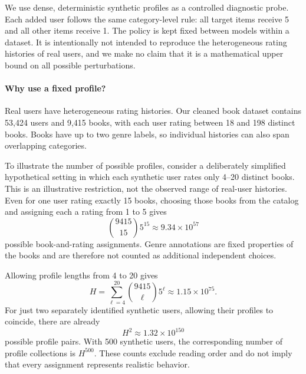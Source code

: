 \documentclass[information,article,submit,pdftex,moreauthors]{Definitions/mdpi}
\newif\ifrevisionnotes
\newcommand{\saracomment}[1]{\ifrevisionnotes\par\smallskip\noindent\textcolor{orange}{\textbf{Sara:} #1}\par\smallskip\fi}
\begin{document}
We use dense, deterministic synthetic profiles as a controlled diagnostic probe. Each added user follows the same category-level rule: all target items receive 5 and all other items receive 1. The policy is kept fixed between models within a dataset. It is intentionally not intended to reproduce the heterogeneous rating histories of real users, and we make no claim that it is a mathematical upper bound on all possible perturbations.

\saracomment{Replaced the genre-ordering example with book-and-rating profile counts. Verified that real book users rated 18--198 distinct books; 4--20 is explicitly a hypothetical sparse-profile illustration. Fixed genre annotations are not counted as independent choices. The hypothetical collection example uses 500 profiles, consistent with the maximum book injection count reported in this manuscript. Sampling realistic profiles remains possible.}

\paragraph{Why use a fixed profile?}
Real users have heterogeneous rating histories. Our cleaned book dataset contains 53,424 users and 9,415 books, with each user rating between 18 and 198 distinct books. Books have up to two genre labels, so individual histories can also span overlapping categories.

To illustrate the number of possible profiles, consider a deliberately simplified hypothetical setting in which each synthetic user rates only 4--20 distinct books. This is an illustrative restriction, not the observed range of real-user histories. Even for one user rating exactly 15 books, choosing those books from the catalog and assigning each a rating from 1 to 5 gives
\[
\binom{9415}{15}5^{15}\approx 9.34\times10^{57}
\]
possible book-and-rating assignments. Genre annotations are fixed properties of the books and are therefore not counted as additional independent choices.

Allowing profile lengths from 4 to 20 gives
\[
H=\sum_{\ell=4}^{20}\binom{9415}{\ell}5^\ell\approx 1.15\times10^{75}.
\]
For just two separately identified synthetic users, allowing their profiles to coincide, there are already
\[
H^2\approx 1.32\times10^{150}
\]
possible profile pairs. With 500 synthetic users, the corresponding number of profile collections is $H^{500}$. These counts exclude reading order and do not imply that every assignment represents realistic behavior.
\end{document}

